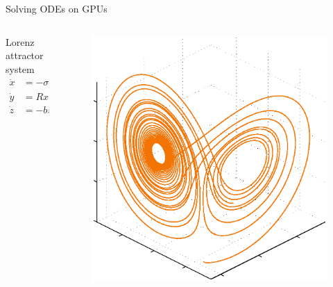 \documentclass[@BEAMER_OPTIONS@]{beamer}
\begin{document}
\begin{frame}{Solving ODEs on GPUs}
    \vspace{-1\baselineskip}
    \begin{columns}
        \begin{column}{0.5\textwidth}
            \begin{block}{Lorenz attractor system}
                \vspace{-1\baselineskip}
                \begin{align*}
                    \dot{x} &= -\sigma \left( x - y \right), \\
                    \dot{y} &= R x - y - xz, \\
                    \dot{z} &= -bz + xy.
                    \label{eq:lorenz}
                \end{align*}
            \end{block}
        \end{column}
        \begin{column}{0.4\textwidth}
            \begin{figure}
                \includegraphics[width=\textwidth]{lorenz}
            \end{figure}

\end{column}
\end{columns}
\end{frame}
\end{document}
